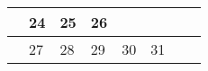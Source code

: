 {\begin{tabularx}{\linewidth}{|l!{\vrule width \myLenLineThicknessThick}*{7}{@{}X@{}|}}
       & 
    
      
      
        \begin{minipage}[t]{6mm}\centering{}24\end{minipage}
      
       & 
    
      
      
        \begin{minipage}[t]{6mm}\centering{}25\end{minipage}
      
       & 
    
      
      
        \begin{minipage}[t]{6mm}\centering{}26\end{minipage}
      
      
        \\  \hline 
      
    
  
  
  
  \hyperlink{week-2026-30}{} &
    
      
      
        \begin{minipage}[t]{6mm}\centering{}27\end{minipage}
      
       & 
    
      
      
        \begin{minipage}[t]{6mm}\centering{}28\end{minipage}
      
       & 
    
      
      
        \begin{minipage}[t]{6mm}\centering{}29\end{minipage}
      
       & 
    
      
      
        \begin{minipage}[t]{6mm}\centering{}30\end{minipage}
      
       & 
    
      
      
        \begin{minipage}[t]{6mm}\centering{}31\end{minipage}
      
       & 
    
      
      
       & 
    
      
      
      
        \\  \hline 
      
    
  
  
  \end{tabularx}
}
